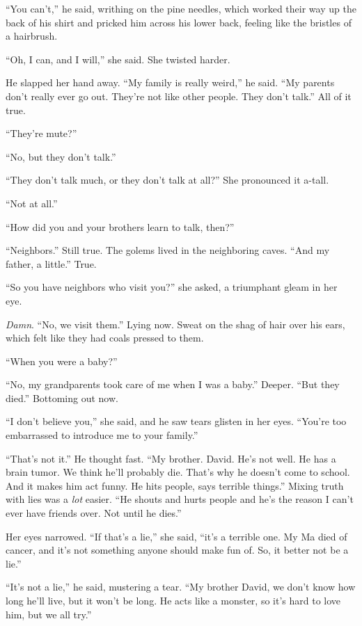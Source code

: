 ``You can't,'' he said, writhing on the pine needles, which worked
their way up the back of his shirt and pricked him across his lower
back, feeling like the bristles of a hairbrush.

``Oh, I can, and I will,'' she said.  She twisted harder.

He slapped her hand away.  ``My family is really weird,'' he said. 
``My parents don't really ever go out.  They're not like other people. 
They don't talk.'' All of it true.

``They're mute?''

``No, but they don't talk.''

``They don't talk much, or they don't talk at all?'' She pronounced it
a-tall.

``Not at all.''

``How did you and your brothers learn to talk, then?''

``Neighbors.'' Still true.  The golems lived in the neighboring caves. 
``And my father, a little.'' True.

``So you have neighbors who visit you?'' she asked, a triumphant gleam
in her eye.

\textit{Damn}.  ``No, we visit them.'' Lying now.  Sweat on the shag
of hair over his ears, which felt like they had coals pressed to them.

``When you were a baby?''

``No, my grandparents took care of me when I was a baby.'' Deeper. 
``But they died.'' Bottoming out now.

``I don't believe you,'' she said, and he saw tears glisten in her
eyes.  ``You're too embarrassed to introduce me to your family.''

``That's not it.'' He thought fast.  ``My brother.  David.  He's not
well.  He has a brain tumor.  We think he'll probably die.  That's why
he doesn't come to school.  And it makes him act funny.  He hits
people, says terrible things.'' Mixing truth with lies was a
\textit{lot} easier.  ``He shouts and hurts people and he's the reason
I can't ever have friends over.  Not until he dies.''

Her eyes narrowed.  ``If that's a lie,'' she said, ``it's a terrible
one.  My Ma died of cancer, and it's not something anyone should make
fun of.  So, it better not be a lie.''

``It's not a lie,'' he said, mustering a tear.  ``My brother David, we
don't know how long he'll live, but it won't be long.  He acts like a
monster, so it's hard to love him, but we all try.''


